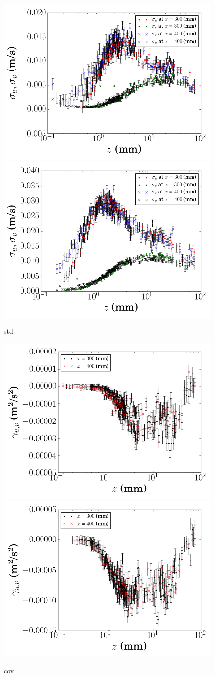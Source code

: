 \documentclass[12pt,oneside,a4paper]{article}
\begin{document}
\begin{figure}[!h]
\centering
\includegraphics[width=0.5\linewidth]{images/LDA_profileImages/std_4hz.png}\hfill
\includegraphics[width=0.5\linewidth]{images/LDA_profileImages/std_8hz.png}
\caption{std}
\end{figure}

\begin{figure}[!h]
\centering
\includegraphics[width=0.5\linewidth]{images/LDA_profileImages/cov_4hz.png}\hfill
\includegraphics[width=0.5\linewidth]{images/LDA_profileImages/cov_8hz.png}
\caption{cov}
\end{figure}
\end{document}
